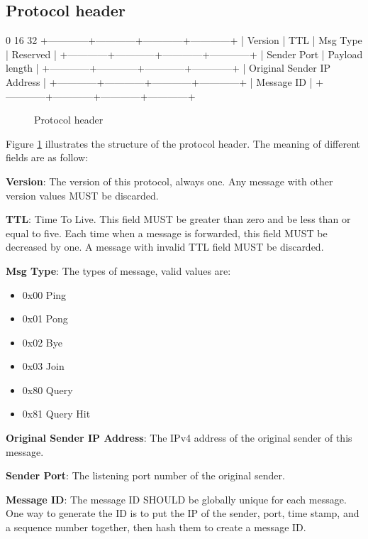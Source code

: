 \documentclass[12pt, a4paper]{article}
\begin{document}
\subsection{Protocol header}
\begin{verbbox}
0                          16                        32
+------------+------------+------------+------------+
|  Version   |     TTL    | Msg Type   |  Reserved  |
+------------+------------+------------+------------+
|       Sender Port       |       Payload length    |
+------------+------------+------------+------------+
|            Original Sender IP Address             |
+------------+------------+------------+------------+
|                     Message ID                    |
+------------+------------+------------+------------+
\end{verbbox}

\begin{figure}[h!]
  \centering
  \theverbbox
  \caption{Protocol header}
  \label{fig:header}
\end{figure}

Figure \ref{fig:header} illustrates the structure of the protocol header.
The meaning of different fields are as follow:

\textbf{Version}: The version of this protocol, always one.
Any message with other version values MUST be discarded.

\textbf{TTL}: Time To Live.
This field MUST be greater than zero and be less than or equal to five.
Each time when a message is forwarded, this field MUST be decreased by one.
A message with invalid TTL field MUST be discarded.

\textbf{Msg Type}: The types of message, valid values are:
\begin{itemize}
\item 0x00 Ping
\item 0x01 Pong
\item 0x02 Bye
\item 0x03 Join
\item 0x80 Query
\item 0x81 Query Hit
\end{itemize}

\textbf{Original Sender IP Address}: The IPv4 address of the original sender of this message.

\textbf{Sender Port}: The listening port number of the original sender.

\textbf{Message ID}: The message ID SHOULD be globally unique for each message. 
One way to generate the ID is to put the IP of the sender, port, time stamp, and a sequence number together, then hash them to create a message ID.
\end{document}
